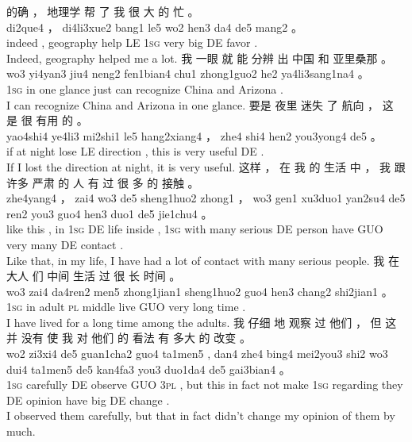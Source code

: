 \documentclass[UTF8]{ctexart}
\begin{document}
\begin{exe}
\ex
\glll
的确 ， 地理学 帮 了 我 很 大 的 忙 。
\\
di2que4 ， di4li3xue2 bang1 le5 wo2 hen3 da4 de5 mang2 。
\\
indeed , geography help LE \textsc{1sg} very big DE favor .
\\
\trans Indeed, geography helped me a lot. 
\ex
\glll
我 一眼 就 能 分辨 出 中国 和 亚里桑那 。
\\
wo3 yi4yan3 jiu4 neng2 fen1bian4 chu1 zhong1guo2 he2 ya4li3sang1na4 。
\\
\textsc{1sg} {in one glance} just can recognize {} China and Arizona .
\\
\trans I can recognize China and Arizona in one glance.
\ex
\glll
要是 夜里 迷失 了 航向 ， 这 是 很 有用 的 。
\\
yao4shi4 ye4li3 mi2shi1 le5 hang2xiang4 ， zhe4 shi4 hen2 you3yong4 de5 。
\\
if {at night} lose LE direction , this is very useful DE .
\\
\trans If I lost the direction at night, it is very useful. 
\ex
\glll
这样 ， 在 我 的 生活 中 ， 我 跟 许多 严肃 的 人 有 过 很 多 的 接触 。
\\
zhe4yang4 ， zai4 wo3 de5 sheng1huo2 zhong1 ， wo3 gen1 xu3duo1 yan2su4 de5 ren2 you3 guo4 hen3 duo1 de5 jie1chu4 。
\\
{like this} , in \textsc{1sg} DE life inside , \textsc{1sg} with many serious DE person have GUO very many DE contact .
\\
\trans Like that, in my life, I have had a lot of contact with many serious people. 
\ex
\glll
我 在 大人 们 中间 生活 过 很 长 时间 。
\\
wo3 zai4 da4ren2 men5 zhong1jian1 sheng1huo2 guo4 hen3 chang2 shi2jian1 。
\\
\textsc{1sg} in adult \textsc{pl} middle live GUO very long time .
\\
\trans I have lived for a long time among the adults. 
\ex
\glll
我 仔细 地 观察 过 他们 ， 但 这 并 没有 使 我 对 他们 的 看法 有 多大 的 改变 。
\\
wo2 zi3xi4 de5 guan1cha2 guo4 ta1men5 , dan4 zhe4 bing4 mei2you3 shi2 wo3 dui4 ta1men5 de5 kan4fa3 you3 duo1da4 de5 gai3bian4 。
\\
\textsc{1sg} carefully DE observe GUO \textsc{3pl} , but this {in fact} not make \textsc{1sg} regarding they DE opinion have big DE change .
\\
\trans I observed them carefully, but that in fact didn't change my opinion of them by much. 
\ex
\glll

\end{exe}
\end{document}
